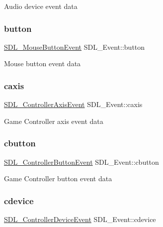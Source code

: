 Audio device event data \mbox{\label{union_s_d_l___event_ab6da2fa2687e5f849f270adecc64785f}} 
\subsubsection{\texorpdfstring{button}{button}}
{\footnotesize\ttfamily \mbox{\hyperlink{struct_s_d_l___mouse_button_event}{S\+D\+L\+\_\+\+Mouse\+Button\+Event}} S\+D\+L\+\_\+\+Event\+::button}

Mouse button event data \mbox{\label{union_s_d_l___event_aa8f6df0f2716fae56204b12ab4a4c289}} 
\subsubsection{\texorpdfstring{caxis}{caxis}}
{\footnotesize\ttfamily \mbox{\hyperlink{struct_s_d_l___controller_axis_event}{S\+D\+L\+\_\+\+Controller\+Axis\+Event}} S\+D\+L\+\_\+\+Event\+::caxis}

Game Controller axis event data \mbox{\label{union_s_d_l___event_aee2b5671c8dcdb447023715cc21593cb}} 
\subsubsection{\texorpdfstring{cbutton}{cbutton}}
{\footnotesize\ttfamily \mbox{\hyperlink{struct_s_d_l___controller_button_event}{S\+D\+L\+\_\+\+Controller\+Button\+Event}} S\+D\+L\+\_\+\+Event\+::cbutton}

Game Controller button event data \mbox{\label{union_s_d_l___event_ad3beed01e690b885728e0b0e1d636378}} 
\subsubsection{\texorpdfstring{cdevice}{cdevice}}
{\footnotesize\ttfamily \mbox{\hyperlink{struct_s_d_l___controller_device_event}{S\+D\+L\+\_\+\+Controller\+Device\+Event}} S\+D\+L\+\_\+\+Event\+::cdevice}

